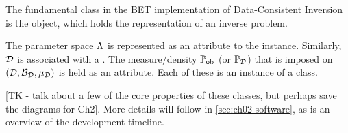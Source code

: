 The fundamental class in the BET implementation of Data-Consistent Inversion is the  object, which holds the representation of an inverse problem.

The parameter space ${\Lambda}$ is represented as an  attribute to the  instance.
Similarly, $\mathcal{D}$ is associated with a .
The measure/density $\operatorname*{\mathbb{P}_{ob}}$ (or $\mathbb{P}_{\mathcal{D}}$) that is imposed on $(\mathcal{D}, \mathcal{B}_{\mathcal{D}}, \mu_{\mathcal{D}})$ is held as an  attribute.
Each of these is an instance of a  class.

[TK - talk about a few of the core properties of these classes, but perhaps save the diagrams for Ch2].
More details will follow in \ref{sec:ch02-software}, as is an overview of the development timeline.
